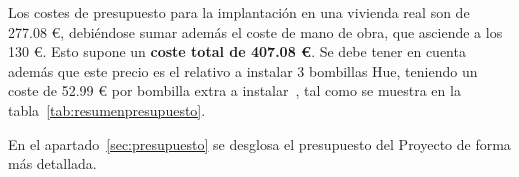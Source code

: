 Los costes de presupuesto para la implantación en una vivienda real son de 277.08 €, debiéndose sumar además el coste de mano de obra, que asciende a los 130 €. Esto supone un \textbf{coste total de 407.08 €}. Se debe tener en cuenta además que este precio es el relativo a instalar 3 bombillas Hue, teniendo un coste de 52.99 € por bombilla extra a instalar~\cite{hueindividualprice}, tal como se muestra en la tabla~\ref{tab:resumenpresupuesto}.

    \begin{table}[!ht]
        \centering
        \caption{Resumen del presupuesto de implantación del Proyecto}
        \label{tab:resumenpresupuesto}
    \end{table}

En el apartado~\ref{sec:presupuesto} se desglosa el presupuesto del Proyecto de forma más detallada.

